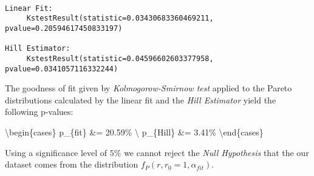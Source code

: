 \documentclass[11pt]{article}
\begin{document}
    \begin{Verbatim}[commandchars=\\\{\}]

Linear Fit:
	 KstestResult(statistic=0.03430683360469211, pvalue=0.20594617450833197)

Hill Estimator:
	 KstestResult(statistic=0.04596602603377958, pvalue=0.0341057116332244)

    \end{Verbatim}

    The goodness of fit given by \emph{Kolmogorow-Smirnow test} applied to
the Pareto distributions calculated by the linear fit and the \emph{Hill
Estimator} yield the following p-values:

\textbackslash{}begin\{cases\} p\_\{fit\} \&= 20.59\% \textbackslash{}
p\_\{Hill\} \&= 3.41\% \textbackslash{}end\{cases\}

Using a significance level of \(5\%\) we cannot reject the \emph{Null
Hypothesis} that the our dataset comes from the distribution
\(f_P(r, r_0=1, \alpha_{fit})\).


    
    
    
    
\end{document}
